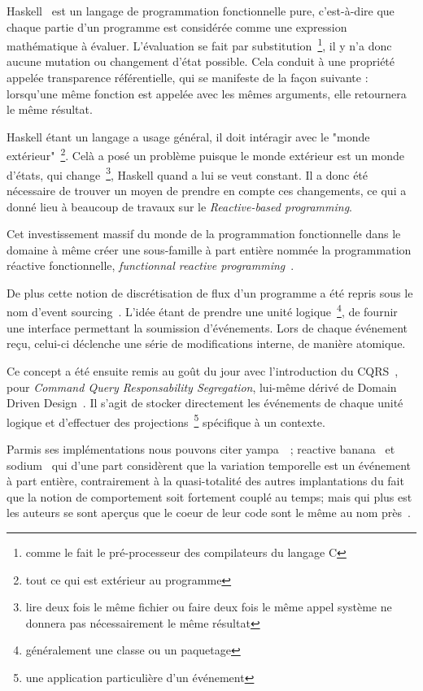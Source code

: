 \documentclass{article}
\begin{document}
Haskell~\cite{haskell} est un langage de programmation fonctionnelle pure, c'est-à-dire
que chaque partie d'un programme est considérée comme une expression mathématique
à évaluer. L'évaluation se fait par substitution~\footnote{comme le fait le pré-processeur
des compilateurs du langage C}, il y n'a donc aucune mutation ou changement d'état
possible. Cela conduit à une propriété appelée transparence référentielle, qui se
manifeste de la façon suivante : lorsqu'une même fonction est appelée avec les mêmes
arguments, elle retournera le même résultat.

Haskell étant un langage a usage général, il doit intéragir avec le "monde extérieur"~\footnote{tout ce qui est extérieur au programme}.
Celà a posé un problème puisque le monde extérieur est un monde d'états, qui change~\footnote{lire deux fois le même fichier ou faire deux fois le même appel système ne donnera pas nécessairement le même résultat},
Haskell quand a lui se veut constant.
Il a donc été nécessaire de trouver un moyen de prendre en compte ces changements,
ce qui a donné lieu à beaucoup de travaux sur le \emph{Reactive-based programming}.

Cet investissement massif du monde de la programmation fonctionnelle
dans le domaine à même créer une sous-famille à part entière nommée la
programmation réactive fonctionnelle, \emph{functionnal reactive programming}~\cite{frp}.

De plus cette notion de discrétisation de flux d'un programme a été repris
sous le nom d'event sourcing~\cite{eventsourcing}. 
L'idée étant de prendre une unité logique~\footnote{généralement une classe ou un paquetage},
de fournir une interface permettant la soumission d'événements. Lors de chaque événement
reçu, celui-ci déclenche une série de modifications interne, de manière atomique.

Ce concept a été ensuite remis au goût du jour avec l'introduction du CQRS~\cite{cqrs},
pour \emph{Command Query Responsability Segregation}, lui-même dérivé de
Domain Driven Design~\cite{ddd}.
Il s'agit de stocker directement les événements de chaque unité logique et d'effectuer
des projections~\footnote{une application particulière d'un événement} spécifique à un contexte.

Parmis ses implémentations nous pouvons citer yampa~\cite{yampa}~\cite{arrows};
reactive banana~\cite{reactivebanana} et sodium~\cite{sodium} qui d'une part considèrent que
la variation temporelle est un événement à part entière, contrairement à
la quasi-totalité des autres implantations du fait que la notion de
comportement soit fortement couplé au temps; mais qui plus est les
auteurs se sont aperçus que le coeur de leur code sont le même au nom
près~\cite{sodium_talk}.
\end{document}
